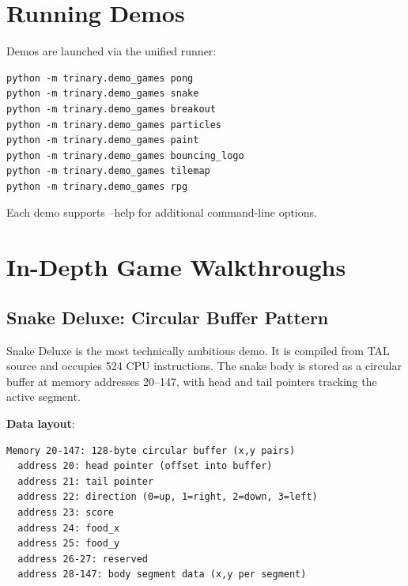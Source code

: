 \documentclass[12pt,a4paper,twoside]{book}
\theoremstyle{trinarytheorem}
\theoremstyle{trinarydefinition}
\newcommand{\code}[1]{\textsf{#1}}
\begin{document}
\section{Running Demos}

Demos are launched via the unified runner:
\begin{verbatim}
python -m trinary.demo_games pong
python -m trinary.demo_games snake
python -m trinary.demo_games breakout
python -m trinary.demo_games particles
python -m trinary.demo_games paint
python -m trinary.demo_games bouncing_logo
python -m trinary.demo_games tilemap
python -m trinary.demo_games rpg
\end{verbatim}

Each demo supports \code{--help} for additional command-line options.

\section{In-Depth Game Walkthroughs}

\subsection{Snake Deluxe: Circular Buffer Pattern}

Snake Deluxe is the most technically ambitious demo. It is compiled from
TAL source and occupies 524 CPU instructions. The snake body is stored
as a circular buffer at memory addresses 20--147, with head and tail
pointers tracking the active segment.

\noindent\textbf{Data layout}:
\begin{verbatim}
Memory 20-147: 128-byte circular buffer (x,y pairs)
  address 20: head pointer (offset into buffer)
  address 21: tail pointer
  address 22: direction (0=up, 1=right, 2=down, 3=left)
  address 23: score
  address 24: food_x
  address 25: food_y
  address 26-27: reserved
  address 28-147: body segment data (x,y per segment)
\end{verbatim}
\end{document}

